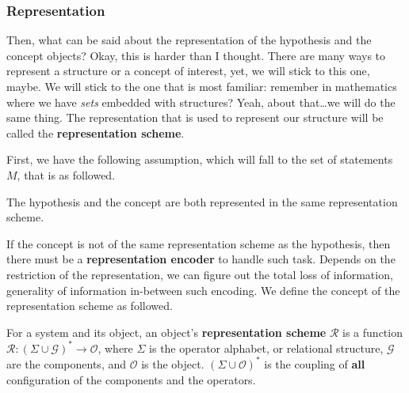 \subsubsection{Representation}
Then, what can be said about the representation of the hypothesis and the concept objects? Okay, this is harder than I thought. There are many ways to represent a structure or a concept of interest, yet, we will stick to this one, maybe. We will stick to the one that is most familiar: remember in mathematics where we have \textit{sets} embedded with structures? Yeah, about that\dots we will do the same thing. The representation that is used to represent our structure will be called the \textbf{representation scheme}. 

First, we have the following assumption, which will fall to the set of statements $M$, that is as followed. 

\begin{assume}
    The hypothesis and the concept are both represented in the same representation scheme. 
\end{assume}
If the concept is not of the same representation scheme as the hypothesis, then there must be a \textbf{representation encoder} to handle such task. Depends on the restriction of the representation, we can figure out the total loss of information, generality of information in-between such encoding. We define the concept of the representation scheme as followed. 
\begin{definition}
    For a system and its object, an object's \textbf{representation scheme} $\bm{\mathcal{R}}$ is a function $\bm{\mathcal{R}}: (\Sigma\cup \mathcal{G})^{*}\to \mathcal{O}$, where $\Sigma$ is the operator alphabet, or relational structure, $\mathcal{G}$ are the components, and $\mathcal{O}$ is the object. $(\Sigma \cup \mathcal{O})^{*}$ is the coupling of \textbf{all} configuration of the components and the operators. 
\end{definition}

